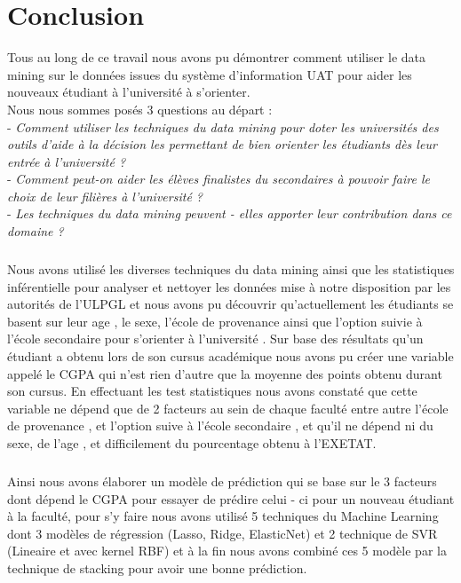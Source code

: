 
\chapter*{Conclusion}
Tous au long de ce travail nous avons pu démontrer comment utiliser le data mining sur le données issues du système d'information \ac{UAT} pour aider les nouveaux étudiant à l'université à s'orienter.\\
Nous nous sommes posés 3 questions au départ : \\
- \emph{Comment utiliser les techniques  du data mining pour doter les universités des outils d'aide à la décision les permettant de bien orienter les étudiants dès leur entrée à l'université ?  }\\
- \emph{Comment peut-on aider les élèves finalistes du secondaires  à pouvoir faire le choix de leur filières à l'université ? }\\
- \emph{Les techniques du data mining peuvent - elles apporter leur contribution dans ce domaine ? }
\paragraph{}
Nous avons utilisé les diverses techniques du data mining ainsi que les statistiques inférentielle pour analyser  et nettoyer les données mise à notre disposition par les autorités de l'\ac{ULPGL} et nous avons pu découvrir qu'actuellement les étudiants se basent sur leur age , le sexe, l'école de provenance ainsi que l'option suivie à l'école secondaire pour s'orienter à l'université .
Sur base des résultats qu'un étudiant a obtenu lors de son cursus académique nous avons pu créer une variable appelé le \ac{CGPA}  qui  n'est rien d'autre que la moyenne des points obtenu durant son cursus. 
En effectuant les test statistiques nous avons constaté que cette variable ne dépend  que de 2 facteurs au sein de chaque faculté entre autre l'école de provenance , et l'option suive à l'école secondaire , et qu'il ne dépend ni du sexe, de l'age , et difficilement du pourcentage obtenu à l'\ac{EXETAT}.
\paragraph{}
Ainsi nous avons élaborer un modèle de prédiction   qui se base sur le 3 facteurs dont dépend le CGPA pour essayer de prédire celui - ci pour un nouveau étudiant à la faculté, pour s'y faire nous avons utilisé 5 techniques du Machine Learning dont 3 modèles de régression (Lasso, Ridge, ElasticNet) et 2 technique de \ac{SVR} (Lineaire et avec kernel RBF)  et à la fin nous avons combiné ces 5 modèle par la technique de stacking pour avoir une bonne prédiction.


